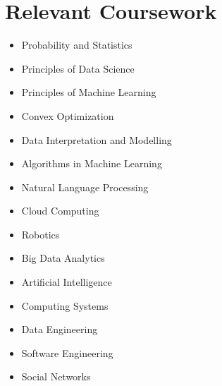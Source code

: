 \documentclass[letterpaper,11pt]{article}
\newcommand{\resumeSubHeadingListStart}{\begin{itemize}[leftmargin=0.0in, label={}]}
\begin{document}
\section{\textcolor{myColor1}{Relevant Coursework}}
        \begin{multicols}{3}
            \begin{itemize}[itemsep=-5pt, parsep=3pt]
                \item\small Probability and Statistics
                \item Principles of Data Science
                \item Principles of Machine Learning
                \item Convex Optimization
                \item Data Interpretation and Modelling
                \item Algorithms in Machine Learning
                \item Natural Language Processing
                \item Cloud Computing
                \item Robotics
                \item Big Data Analytics
                \item Artificial Intelligence
                \item Computing Systems
                \item Data Engineering
                \item Software Engineering
                \item Social Networks
            \end{itemize}
        \end{multicols}
        \vspace*{2.0\multicolsep}
\end{document}

